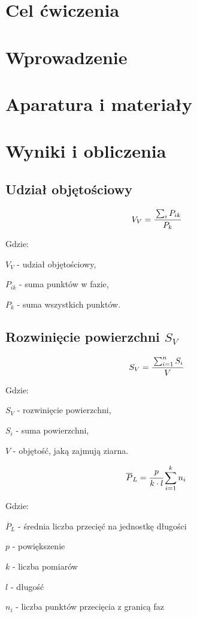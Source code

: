 \documentclass[a4paper,12pt]{article}
\begin{document}
    



\section{Cel ćwiczenia}

\section{Wprowadzenie}

\section{Aparatura i materiały}

\section{Wyniki i obliczenia}

\subsection{Udział objętościowy}

$$V_V=\cfrac{\sum _i P_{ik}}{P_k}$$

Gdzie:

$V_V$ - udział objętościowy,

$P_{ik}$ - suma punktów w fazie,

$P_k$ - suma wszystkich punktów.

\subsection{Rozwinięcie powierzchni $S_V$}

$$S_V=\cfrac{\sum ^n_{i=1} S_i}{V}$$

Gdzie:

$S_V$ - rozwinięcie powierzchni,

$S_i$ - suma powierzchni,

$V$ - objętość, jaką zajmują ziarna.

$$\overline{P}_L=\cfrac{p}{k\cdot l}\sum^k_{i=1}n_i$$

Gdzie:

$\overline{P}_L$ - średnia liczba przecięć na jednostkę długości 

$p$ - powiększenie

$k$ - liczba pomiarów

$l$ - długość

$n_i$ - liczba punktów przecięcia z granicą faz
\end{document}
